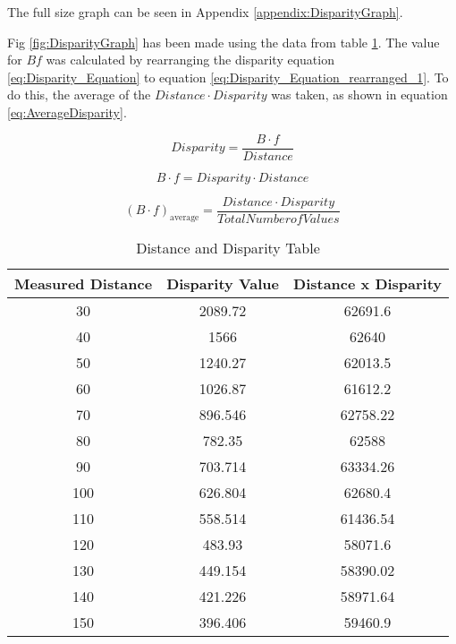 \documentclass[conference]{IEEEtran}
\begin{document}
The full size graph can be seen in Appendix \ref{appendix:DisparityGraph}.

Fig \ref{fig:DisparityGraph} has been made using the data from table \ref{table:distance_and_disparity_tables}. The value for $Bf$ was calculated by rearranging the disparity equation \ref{eq:Disparity_Equation} to equation \ref{eq:Disparity_Equation_rearranged_1}. To do this, the average of the $Distance \cdot Disparity$ was taken, as shown in equation \ref{eq:AverageDisparity}. 

\begin{equation} \label{eq:Disparity_Equation}
Disparity = \frac{B \cdot f}{Distance}
\end{equation}

\begin{equation} \label{eq:Disparity_Equation_rearranged_1}
B \cdot f = Disparity \cdot Distance
\end{equation}

\begin{equation} \label{eq:AverageDisparity}
(B \cdot f)_\textrm{average} = \frac{Distance \cdot Disparity}{Total Number of Values}
\end{equation}

\begin{table}
\begin{center}
\caption{Distance and Disparity Table}
\begin{tabular}{ || c || c || c || }
\hline
 Measured Distance & Disparity Value & Distance x Disparity\\ 
\hline
 30 & 2089.72 & 62691.6 \\  
\hline
 40 & 1566 & 62640 \\  
\hline
 50 & 1240.27 & 62013.5 \\  
\hline
 60 & 1026.87 & 61612.2 \\  
\hline
 70 & 896.546 & 62758.22 \\  
\hline
 80 & 782.35 & 62588 \\  
\hline
 90 & 703.714 & 63334.26 \\  
\hline
 100 & 626.804 & 62680.4 \\  
\hline
 110 & 558.514 & 61436.54 \\  
\hline
 120 & 483.93 & 58071.6 \\  
\hline
 130 & 449.154 & 58390.02 \\  
\hline
 140 & 421.226 & 58971.64 \\  
\hline
 150 & 396.406 & 59460.9 \\  
\hline

\end{tabular}
\label{table:distance_and_disparity_tables}
\end{center}
\end{table}
\end{document}
